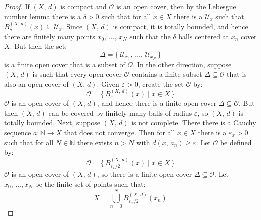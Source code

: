 \documentclass{article}
\theoremstyle{plain}
\theoremstyle{normal}
\begin{document}
        \begin{proof}
            If $(X,\,d)$ is compact and $\mathcal{O}$ is an open cover, then
            by the Lebesgue number lemma there is a $\delta>0$ such that for
            all $x\in{X}$ there is a $\mathcal{U}_{x}$ such that
            $B_{\delta}^{(X,\,d)}(x)\subseteq\mathcal{U}_{x}$. Since
            $(X,\,d)$ is compact, it is totally bounded, and hence there are
            finitely many points $x_{0},\,\dots,\,x_{N}$ such that the
            $\delta$ balls centered at $x_{n}$ cover $X$. But then the set:
            \begin{equation}
                \Delta=\{\,\mathcal{U}_{x_{0}},\,\dots,\,\mathcal{U}_{x_{N}}\,\}
            \end{equation}
            is a finite open cover that is a subset of $\mathcal{O}$. In the
            other direction, suppose $(X,\,d)$ is such that every open cover
            $\mathcal{O}$ contains a finite subset $\Delta\subseteq\mathcal{O}$
            that is also an open cover of $(X,\,d)$. Given $\varepsilon>0$,
            create the set $\mathcal{O}$ by:
            \begin{equation}
                \mathcal{O}=\{\,B_{\varepsilon}^{(X,\,d)}(x)\;|\;x\in{X}\,\}
            \end{equation}
            $\mathcal{O}$ is an open cover of $(X,\,d)$, and hence there is a
            finite open cover $\Delta\subseteq\mathcal{O}$. But then $(X,\,d)$
            can be covered by finitely many balls of radius $\varepsilon$, so
            $(X,\,d)$ is totally bounded. Next, suppose $(X,\,d)$ is not
            complete. There there is a Cauchy sequence
            $a:\mathbb{N}\rightarrow{X}$ that does not converge. Then for all
            $x\in{X}$ there is a $\varepsilon_{x}>0$ such that for all
            $N\in\mathbb{N}$ there exists $n>N$ with
            $d(x,\,a_{n})\geq\varepsilon$. Let $\mathcal{O}$ be defined by:
            \begin{equation}
                \mathcal{O}=\{\,B_{\varepsilon_{x}/2}^{(X,\,d)}(x)\;|\;x\in{X}\,\}
            \end{equation}
            $\mathcal{O}$ is an open cover of $(X,\,d)$, so there is a finite
            open cover $\Delta\subseteq\mathcal{O}$. Let
            $x_{0},\,\dots,x_{N}$ be the finite set of points such that:
            \begin{equation}
                X=\bigcup_{n=0}^{N}B_{\varepsilon_{n}/2}^{(X,\,d)}(x_{n})
            \end{equation}

\end{proof}
\end{document}
